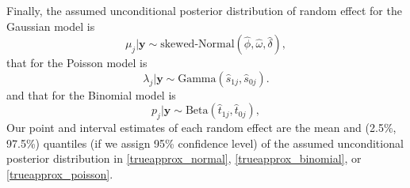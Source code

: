 \documentclass[article]{jss}
\begin{document}
Finally, the assumed unconditional posterior distribution of random effect for the Gaussian model is
\begin{equation}\label{trueapprox_normal}
\mu_j\vert \boldsymbol{y} \sim \textrm{skewed-Normal}(\hat{\phi}, \hat{\omega}, \hat{\delta}),
\end{equation}
that for the Poisson model is
\begin{equation}\label{trueapprox_poisson}
\lambda_j\vert \boldsymbol{y} \sim \textrm{Gamma}(\hat{s}_{1j}, \hat{s}_{0j}).
\end{equation}
and that for the Binomial model is
\begin{equation}\label{trueapprox_binomial}
p_j\vert \boldsymbol{y} \sim \textrm{Beta}(\hat{t}_{1j}, \hat{t}_{0j}),
\end{equation}
Our point and interval estimates of each random effect are the mean and (2.5\%, 97.5\%) quantiles (if we assign 95\% confidence level) of the assumed unconditional posterior distribution in  \eqref{trueapprox_normal}, \eqref{trueapprox_binomial}, or \eqref{trueapprox_poisson}.









\end{document}
